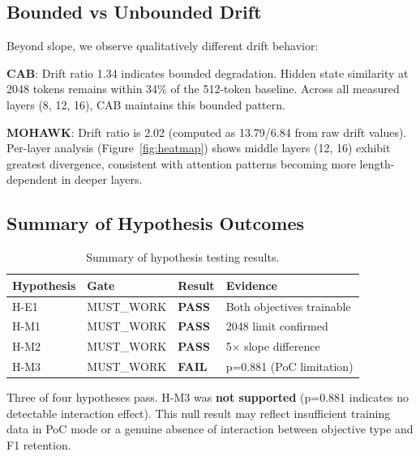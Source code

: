 \subsection{Bounded vs Unbounded Drift}

Beyond slope, we observe qualitatively different drift behavior:

\textbf{CAB}: Drift ratio 1.34 indicates bounded degradation. Hidden state similarity at 2048 tokens remains within 34\% of the 512-token baseline. Across all measured layers (8, 12, 16), CAB maintains this bounded pattern.

\textbf{MOHAWK}: Drift ratio is 2.02 (computed as 13.79/6.84 from raw drift values). Per-layer analysis (Figure~\ref{fig:heatmap}) shows middle layers (12, 16) exhibit greatest divergence, consistent with attention patterns becoming more length-dependent in deeper layers.

\subsection{Summary of Hypothesis Outcomes}

\begin{table}[h]
\centering
\caption{Summary of hypothesis testing results.}
\begin{tabular}{@{}llll@{}}
\toprule
Hypothesis & Gate & Result & Evidence \\
\midrule
H-E1 & MUST\_WORK & \textbf{PASS} & Both objectives trainable \\
H-M1 & MUST\_WORK & \textbf{PASS} & 2048 limit confirmed \\
H-M2 & MUST\_WORK & \textbf{PASS} & 5$\times$ slope difference \\
H-M3 & MUST\_WORK & \textbf{FAIL} & p=0.881 (PoC limitation) \\
\bottomrule
\end{tabular}
\end{table}

Three of four hypotheses pass. H-M3 was \textbf{not supported} (p=0.881 indicates no detectable interaction effect). This null result may reflect insufficient training data in PoC mode or a genuine absence of interaction between objective type and F1 retention.
